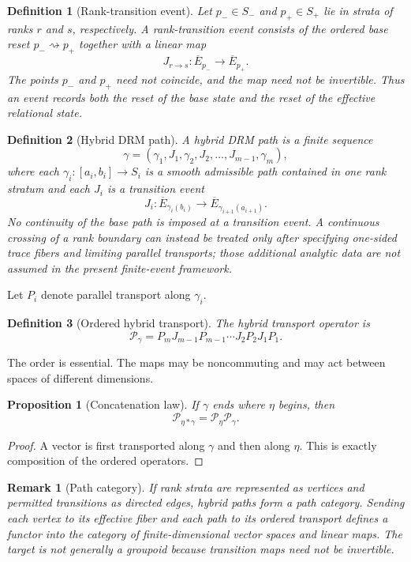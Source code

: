 \documentclass[11pt]{article}
\newtheorem{definition}{Definition}[section]
\newtheorem{proposition}{Proposition}[section]
\newtheorem{remark}{Remark}[section]
\begin{document}
\begin{definition}[Rank-transition event]
Let $p_-\in S_-$ and $p_+\in S_+$ lie in strata of ranks $r$ and $s$,
respectively. A rank-transition event consists of the ordered base reset
$p_-\rightsquigarrow p_+$ together with a linear map
\[
J_{r\to s}:\overline E_{p_-}\to\overline E_{p_+}.
\]
The points $p_-$ and $p_+$ need not coincide, and the map need not be
invertible. Thus an event records both the reset of the base state and the
reset of the effective relational state.
\end{definition}

\begin{definition}[Hybrid DRM path]
A hybrid DRM path is a finite sequence
\[
\gamma=(\gamma_1,J_1,\gamma_2,J_2,\ldots,J_{m-1},\gamma_m),
\]
where each $\gamma_i:[a_i,b_i]\to S_i$ is a smooth admissible path contained
in one rank stratum and each $J_i$ is a transition event
\[
J_i:\overline E_{\gamma_i(b_i)}
\longrightarrow\overline E_{\gamma_{i+1}(a_{i+1})}.
\]
No continuity of the base path is imposed at a transition event. A continuous
crossing of a rank boundary can instead be treated only after specifying
one-sided trace fibers and limiting parallel transports; those additional
analytic data are not assumed in the present finite-event framework.
\end{definition}

Let $P_i$ denote parallel transport along $\gamma_i$.

\begin{definition}[Ordered hybrid transport]
The hybrid transport operator is
\[
\mathcal P_\gamma
=P_mJ_{m-1}P_{m-1}\cdots J_2P_2J_1P_1.
\]
\end{definition}

The order is essential. The maps may be noncommuting and may act between
spaces of different dimensions.

\begin{proposition}[Concatenation law]
If $\gamma$ ends where $\eta$ begins, then
\[
\mathcal P_{\eta*\gamma}=\mathcal P_\eta\mathcal P_\gamma.
\]
\end{proposition}

\begin{proof}
A vector is first transported along $\gamma$ and then along $\eta$. This is
exactly composition of the ordered operators.
\end{proof}

\begin{remark}[Path category]
If rank strata are represented as vertices and permitted transitions as
directed edges, hybrid paths form a path category. Sending each vertex to its
effective fiber and each path to its ordered transport defines a functor into
the category of finite-dimensional vector spaces and linear maps. The target
is not generally a groupoid because transition maps need not be invertible.
\end{remark}
\end{document}
